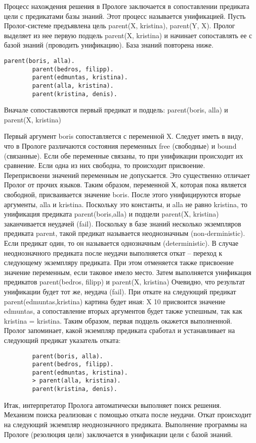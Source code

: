 \documentclass[../main.tex]{subfiles}
\begin{document}
	Процесс нахождения решения в Прологе заключается в сопоставлении предиката цели с предикатами базы знаний. Этот процесс называется унификацией. Пусть Пролог-системе предъявлена цель parent(X, kristina), parent(Y, X). Пролог выделяет из нее первую подцель parent(X, kristina) и начинает сопоставлять ее с базой знаний (проводить унификацию). База знаний повторена ниже.
	
	\begin{lstlisting}[frame=single caption=Факты]
		parent(boris, alla).
		parent(bedros, filipp).
		parent(edmuntas, kristina).
		parent(alla, kristina).
		parent(kristina, denis).
	\end{lstlisting}
	
	Вначале сопоставляются первый предикат и подцель:
	parent(boris, alla) и parent(X, kristina)
	
	Первый аргумент boris сопоставляется с переменной X. Следует иметь в виду, что в Прологе различаются состояния переменных
	free (свободные) и bound (связанные). Если обе переменные связаны, то при унификации происходит их сравнение. Если одна из них свободна, то происходит присвоение. 
	Переприсвоени значений переменным не допускается. 
	Это существенно отличает Пролог от прочих языков. 
	Таким образом, переменной Х, которая пока является свободной, присваивается значение boris. 
	После этого унифицируются вторые аргументы, alla и kristina. Поскольку это константы, и alla не равно kristina, то унификация предиката parent(boris,alla) и подцели parent(X, kristina) заканчивается неудачей (fail).
	Поскольку в базе знаний несколько экземпляров предиката parent, такой предикат называется неоднозначным (non-derministic). Если предикат один, то он называется однозначным (deterministic). 
	В случае неоднозначного предиката после неудачи выполняется откат – переход к следующему экземпляру предиката. 
	При этом отменяется также присвоение значение переменным, если таковое имело место. Затем выполняется унификация предикатов parent(bedros, filipp) и parent(X, kristina)
	Очевидно, что результат унификации будет тот же, неудача (fail). 
	При откате на следующий предикат parent(edmuntas,kristina) картина будет иная: X 10 присвоится значение edmuntas, а сопоставление вторых аргументов будет также успешным, так как kristina = kristina. Таким образом, первая подцель окажется выполненной. 
	Пролог запоминает, какой экземпляр предиката сработал и устанавливает на следующий предикат указатель отката:
	\begin{lstlisting}
		parent(boris, alla).
		parent(bedros, filipp).
		parent(edmuntas, kristina).
		> parent(alla, kristina).
		parent(kristina, denis).
	\end{lstlisting}

	Итак, интерпретатор Пролога автоматически выполняет поиск
	решения. Механизм поиска реализован с помощью отката после неудачи.
	Откат происходит на следующий экземпляр неоднозначного предиката.
	Выполнение программы на Прологе (резолюция цели) заключается в
	унификации цели с базой знаний. 
\end{document}
